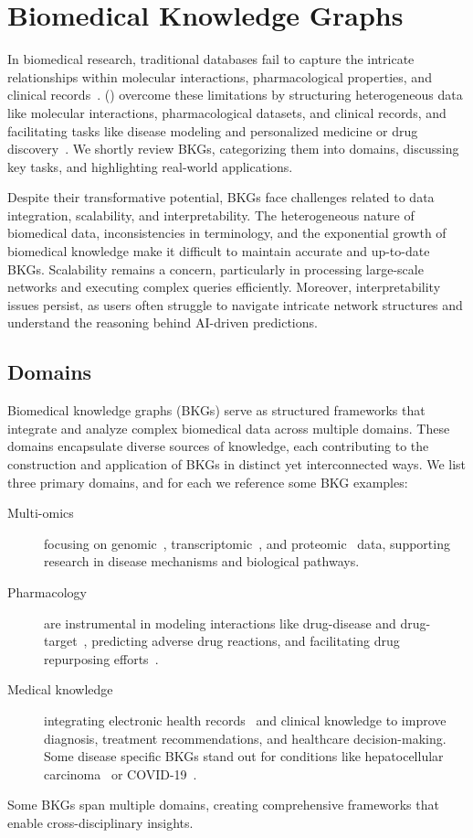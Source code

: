 \section{Biomedical Knowledge Graphs}\label{kgs:biomed}
In biomedical research, traditional databases fail to capture the intricate relationships within molecular interactions, pharmacological properties, and clinical records~\cite{Callahan2020KBDS}\cite{Su2020NetworkEmbeddingBiomedicalbDS}.  () overcome these limitations by structuring heterogeneous data like molecular interactions, pharmacological datasets, and clinical records, and facilitating tasks like disease modeling and personalized medicine or drug discovery~\cite{Lu2025BiomedicalKG}. We shortly review BKGs, categorizing them into domains, discussing key tasks, and  highlighting real-world applications.

Despite their transformative potential, BKGs face challenges related to data integration, scalability, and interpretability. The heterogeneous nature of biomedical data, inconsistencies in terminology, and the exponential growth of biomedical knowledge make it difficult to maintain accurate and up-to-date BKGs. Scalability remains a concern, particularly in processing large-scale networks and executing complex queries efficiently. Moreover, interpretability issues persist, as users often struggle to navigate intricate network structures and understand the reasoning behind AI-driven predictions.

\subsection{Domains}
Biomedical knowledge graphs (BKGs) serve as structured frameworks that integrate and analyze complex biomedical data across multiple domains. These domains encapsulate diverse sources of knowledge, each contributing to the construction and application of BKGs in distinct yet interconnected ways. We list three primary domains, and for each we reference some BKG examples:
\begin{description}
    \item[Multi-omics] focusing on genomic~\cite{Jha2019genomicsKG}, transcriptomic~\cite{CavalleriEmanuele2024Aokg}, and proteomic~\cite{Zhang2022ontoprotein} data, supporting research in disease mechanisms and biological pathways.
    \item[Pharmacology] are instrumental in modeling interactions like drug-disease and drug-target~\cite{Gonzalez2023drugmechdb}, predicting adverse drug reactions, and facilitating drug repurposing efforts~\cite{Huang2024foundationModelDrugRepurposing}.
    \item[Medical knowledge] integrating electronic health records~\cite{Shang2021ehr} and clinical knowledge to improve diagnosis, treatment recommendations, and healthcare decision-making. Some disease specific BKGs stand out for conditions like hepatocellular carcinoma~\cite{Li2020kghc} or COVID-19~\cite{Zheng2021multiModalKGCOVID19}.
\end{description}
Some BKGs span multiple domains, creating comprehensive frameworks that enable cross-disciplinary insights.

